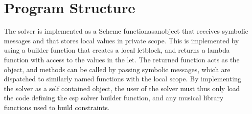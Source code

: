 \documentclass[letterpaper,10pt,english]{sphinxmanual}
\begin{document}
\chapter{Program Structure}
\label{\detokenize{index:program-structure}}
\sphinxAtStartPar
The solver is implemented as a Scheme function\sphinxhyphen{}as\sphinxhyphen{}an\sphinxhyphen{}object that receives symbolic messages and that stores local values in private scope.
This is implemented by using a builder function that creates a local let\sphinxhyphen{}block, and returns a lambda function with
access to the values in the let. The returned function acts as the object, and methods can be called by passing
symbolic messages, which are dispatched to similarly named functions with the local scope.
By implementing the solver as a self contained object, the user of the solver must thus only load the code defining the csp solver
builder function, and any musical library functions used to build constraints.
\end{document}
